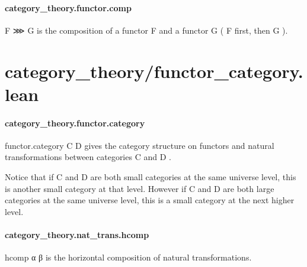 \documentclass{article}
\begin{document}
\paragraph{category\_theory.functor.comp}
\par
\colorbox[RGB]{253,246,227}{{{{\color[RGB]{101, 123, 131} F ⋙ G }}}} is the composition of a functor 
\colorbox[RGB]{253,246,227}{{{{\color[RGB]{101, 123, 131} F }}}} and a functor 
\colorbox[RGB]{253,246,227}{{{{\color[RGB]{101, 123, 131} G }}}} (
\colorbox[RGB]{253,246,227}{{{{\color[RGB]{101, 123, 131} F }}}} first, then 
\colorbox[RGB]{253,246,227}{{{{\color[RGB]{101, 123, 131} G }}}}).
\section{category\_theory/functor\_category.lean}\paragraph{category\_theory.functor.category}
\par
\colorbox[RGB]{253,246,227}{{{{\color[RGB]{101, 123, 131} functor.category C D }}}} gives the category structure on functors and natural transformations
between categories 
\colorbox[RGB]{253,246,227}{{{{\color[RGB]{101, 123, 131} C }}}} and 
\colorbox[RGB]{253,246,227}{{{{\color[RGB]{101, 123, 131} D }}}}.
\par
Notice that if 
\colorbox[RGB]{253,246,227}{{{{\color[RGB]{101, 123, 131} C }}}} and 
\colorbox[RGB]{253,246,227}{{{{\color[RGB]{101, 123, 131} D }}}} are both small categories at the same universe level,
this is another small category at that level.
However if 
\colorbox[RGB]{253,246,227}{{{{\color[RGB]{101, 123, 131} C }}}} and 
\colorbox[RGB]{253,246,227}{{{{\color[RGB]{101, 123, 131} D }}}} are both large categories at the same universe level,
this is a small category at the next higher level.
\paragraph{category\_theory.nat\_trans.hcomp}
\par
\colorbox[RGB]{253,246,227}{{{{\color[RGB]{101, 123, 131} hcomp α β }}}} is the horizontal composition of natural transformations.
\end{document}
